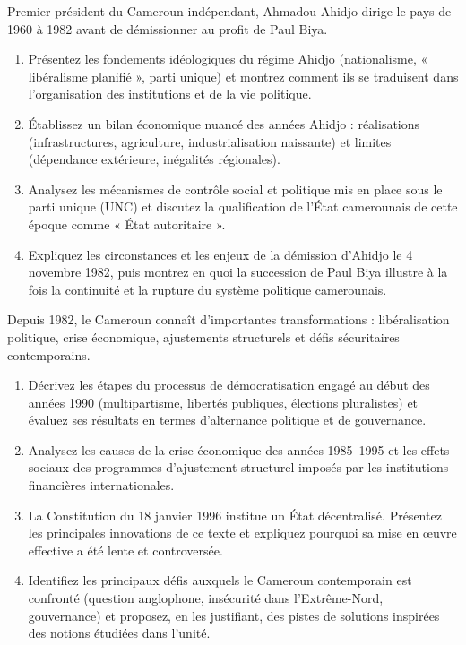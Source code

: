 \documentclass[11pt]{article}
\begin{document}
\begin{exercice}
Premier président du Cameroun indépendant, Ahmadou Ahidjo dirige le pays de 1960 à 1982 avant de démissionner au profit de Paul Biya.
\begin{enumerate}
\item Présentez les fondements idéologiques du régime Ahidjo (nationalisme, « libéralisme planifié », parti unique) et montrez comment ils se traduisent dans l'organisation des institutions et de la vie politique.
\item Établissez un bilan économique nuancé des années Ahidjo : réalisations (infrastructures, agriculture, industrialisation naissante) et limites (dépendance extérieure, inégalités régionales).
\item Analysez les mécanismes de contrôle social et politique mis en place sous le parti unique (UNC) et discutez la qualification de l'État camerounais de cette époque comme « État autoritaire ».
\item Expliquez les circonstances et les enjeux de la démission d'Ahidjo le 4 novembre 1982, puis montrez en quoi la succession de Paul Biya illustre à la fois la continuité et la rupture du système politique camerounais.
\end{enumerate}
\end{exercice}

\begin{exercice}
Depuis 1982, le Cameroun connaît d'importantes transformations : libéralisation politique, crise économique, ajustements structurels et défis sécuritaires contemporains.
\begin{enumerate}
\item Décrivez les étapes du processus de démocratisation engagé au début des années 1990 (multipartisme, libertés publiques, élections pluralistes) et évaluez ses résultats en termes d'alternance politique et de gouvernance.
\item Analysez les causes de la crise économique des années 1985--1995 et les effets sociaux des programmes d'ajustement structurel imposés par les institutions financières internationales.
\item La Constitution du 18 janvier 1996 institue un État décentralisé. Présentez les principales innovations de ce texte et expliquez pourquoi sa mise en \oe{}uvre effective a été lente et controversée.
\item Identifiez les principaux défis auxquels le Cameroun contemporain est confronté (question anglophone, insécurité dans l'Extrême-Nord, gouvernance) et proposez, en les justifiant, des pistes de solutions inspirées des notions étudiées dans l'unité.
\end{enumerate}
\end{exercice}
\end{document}
